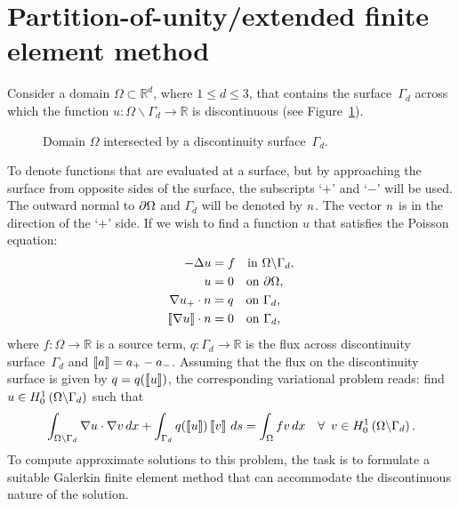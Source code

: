 \section{Partition-of-unity/extended finite element method}
%
Consider a domain $\Omega \subset \mathbb{R}^{d}$, where $1 \leqslant d \leqslant 3$,
that contains the surface~$\Gamma_{d}$ across which the function $u:
\Omega\backslash \Gamma_{d} \rightarrow \mathbb{R}$ is discontinuous
(see Figure~\ref{fig:nikbakht:domain}).
%
\begin{figure}
  \centering
  \caption{Domain $\Omega$ intersected by a discontinuity
    surface~$\Gamma_{d}$.}
  \label{fig:nikbakht:domain}
\end{figure}
%
To denote functions that are evaluated at a surface, but by approaching
the surface from opposite sides of the surface, the subscripts `$+$' and
`$-$' will be used. The outward normal to $\partial \Omega$ and $\Gamma_{d}$
will be denoted by $n$. The vector $n$ is in the direction
of the `$+$' side. If we wish to find a function $u$ that
satisfies the Poisson equation:
%
\begin{align}
  - \Delta u &= f \quad {\rm in} \ \Omega \backslash \Gamma_{d}, \\
           u &= 0 \quad {\rm on} \ \partial \Omega, \\
  \nabla u_{+} \cdot n &= q \quad {\rm on} \ \Gamma_{d},\\
  \left\llbracket {\nabla u} \right\rrbracket \cdot n &= 0 \quad {\rm on} \ \Gamma_{d},
\end{align}
where $f: \Omega \rightarrow \mathbb{R}$ is a source term,
$q: \Gamma_d \rightarrow \mathbb{R}$ is the flux across discontinuity
surface~$\Gamma_d$ and $\left\llbracket {a} \right\rrbracket = a_{+} - a_{-}$.
Assuming that the flux on the discontinuity surface is given by $q =
q(\left\llbracket {u} \right\rrbracket)$, the corresponding variational problem reads: find $u \in
H_{0}^{1}\left( {\Omega\backslash\Gamma_{d}} \right)$ such that
%
\begin{equation}
  \int_{\Omega\backslash\Gamma_{d}}  \nabla u \cdot \nabla v \, d x
      + \int_{\Gamma_d} q(\left\llbracket {u} \right\rrbracket)\left\llbracket {v} \right\rrbracket \, d s
      = \int_{\Omega} f v \, d x
\quad \forall\, \ v \in H_{0}^{1}\left( {\Omega\backslash\Gamma_{d}} \right).
\label{eqn:nikbakht:poisson_discontinuous_variational}
\end{equation}
%
To compute approximate solutions to this problem, the task is to formulate
a suitable Galerkin finite element method that can accommodate the
discontinuous nature of the solution.

